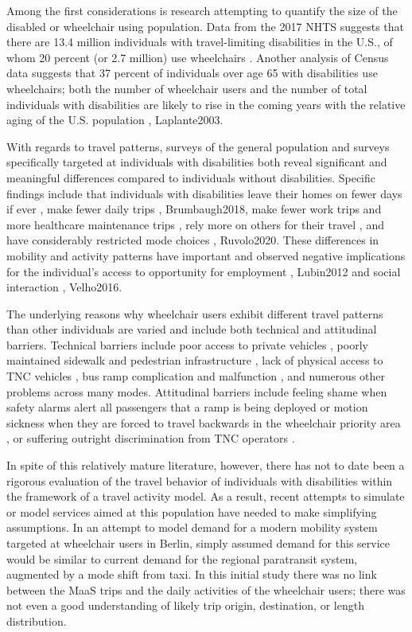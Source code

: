 \documentclass[3p, authoryear, review]{elsarticle} %
\begin{document}
Among the first considerations is research attempting to quantify the size
of the disabled or wheelchair using population. Data from the 2017 NHTS
suggests that there are 13.4 million individuals with travel-limiting disabilities
in the U.S., of whom 20 percent (or 2.7 million) use wheelchairs \citet{Brumbaugh2018}.
Another analysis of Census data suggests that 37 percent of individuals over
age 65 with disabilities use wheelchairs; both the number of wheelchair users
and the number of total individuals with disabilities are likely to rise
in the coming years with the relative aging of the U.S. population \citet{Sweeney2004}, Laplante2003.

With regards to travel patterns, surveys of the general population and surveys
specifically targeted at individuals with disabilities both reveal significant and
meaningful differences compared to individuals without disabilities. Specific
findings include that individuals with disabilities leave their homes on fewer
days if ever \citet{Sweeney2004}, make fewer daily trips
\citet{Schmocker2005}, Brumbaugh2018, make fewer work trips and more
healthcare maintenance trips \citet{Ermagun2016}, rely more on others for their travel \citet{Sweeney2004},
and have considerably restricted mode
choices \citet{Rosenbloom2007}, Ruvolo2020. These differences in mobility and activity patterns
have important and observed negative implications for the individual's access to
opportunity for employment \citet{Rosenbloom2007}, Lubin2012 and social interaction
\citet{Bascom2017}, Velho2016.

The underlying reasons why wheelchair users exhibit different travel patterns
than other individuals are varied and include both technical and attitudinal
barriers. Technical barriers include poor access to private vehicles
\citet{VanRoosmalen2010}, poorly maintained sidewalk and pedestrian infrastructure
\citet{frackelton2013measuring}, lack of physical access to TNC
vehicles \citet{Ruvolo2020}, bus ramp complication and malfunction \citet{Velho2016},
and numerous other problems across many modes.
Attitudinal barriers include feeling shame when safety alarms alert all
passengers that a ramp is being deployed or motion sickness when they are forced
to travel backwards in the wheelchair priority area \citet{Velho2016}, or
suffering outright discrimination from TNC operators \citet{Bascom2017}.

In spite of this relatively mature literature, however, there has not to
date been a rigorous evaluation of the travel behavior of individuals with
disabilities within the framework of a travel activity model. As a result,
recent attempts to simulate or model services aimed at this population have
needed to make simplifying assumptions. In an attempt to model demand for a
modern mobility
system targeted at wheelchair users in
Berlin, \citet{Bischoff2019} simply assumed demand for this service
would be similar to current demand for the regional paratransit system, augmented
by a mode shift from taxi. In this initial study there was no link between the
MaaS trips and the daily activities of the wheelchair users; there was not even a
good understanding of likely trip origin, destination, or length distribution.
\end{document}
